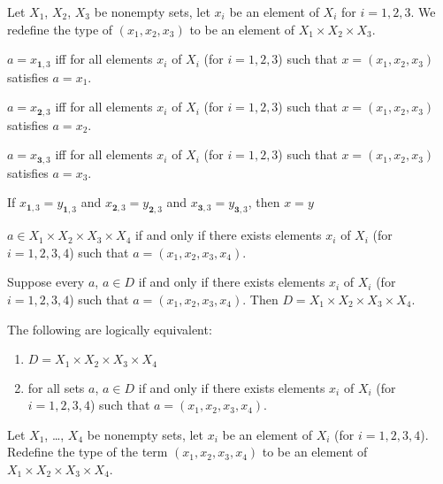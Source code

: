 \documentclass{article}
\begin{document}
\begin{definition}
Let $X_{1}$, $X_{2}$, $X_{3}$ be nonempty sets, let $x_{i}$ be an
element of $X_{i}$ for $i=1,2,3$.
We redefine the type of $(x_{1},x_{2},x_{3})$ to be an element of
$X_{1}\times X_{2}\times X_{3}$.
\end{definition}

\begin{thm}
\item\label{domain1:6} $a=x_{\mathbf{1},3}$ iff for all elements $x_{i}$ of $X_{i}$ (for $i=1,2,3$) such that $x=(x_{1},x_{2},x_{3})$ satisfies $a=x_{1}$.
\item\label{domain1:7} $a=x_{\mathbf{2},3}$ iff for all elements $x_{i}$ of $X_{i}$ (for $i=1,2,3$) such that $x=(x_{1},x_{2},x_{3})$ satisfies $a=x_{2}$.
\item\label{domain1:8} $a=x_{\mathbf{3},3}$ iff for all elements $x_{i}$ of $X_{i}$ (for $i=1,2,3$) such that $x=(x_{1},x_{2},x_{3})$ satisfies $a=x_{3}$.
\item\label{domain1:9} If $x_{\mathbf{1},3}=y_{\mathbf{1},3}$ and
  $x_{\mathbf{2},3}=y_{\mathbf{2},3}$ and
  $x_{\mathbf{3},3}=y_{\mathbf{3},3}$, then $x=y$
\item\label{domain1:10} $a\in X_{1}\times X_{2}\times X_{3}\times X_{4}$
  if and only if there exists elements $x_{i}$ of $X_{i}$ (for $i=1,2,3,4$)
  such that $a=(x_{1},x_{2},x_{3},x_{4})$.
\item\label{domain1:11} Suppose every $a$, $a\in D$ if and only if there
  exists elements $x_{i}$ of $X_{i}$ (for $i=1,2,3,4$) such that
  $a=(x_{1},x_{2},x_{3},x_{4})$.
  Then $D=X_{1}\times X_{2}\times X_{3}\times X_{4}$.
\item\label{domain1:12} The following are logically equivalent:
  \begin{enumerate}[label=(\roman*)]
  \item $D=X_{1}\times X_{2}\times X_{3}\times X_{4}$
  \item for all sets $a$, $a\in D$ if and only if there exists elements
    $x_{i}$ of $X_{i}$ (for $i=1,2,3,4$) such that $a=(x_{1},x_{2},x_{3},x_{4})$.
  \end{enumerate}
\end{thm}

\begin{definition}
Let $X_{1}$, \dots, $X_{4}$ be nonempty sets, let $x_{i}$ be an element
of $X_{i}$ (for $i=1,2,3,4$). Redefine the type of the term
$(x_{1},x_{2},x_{3},x_{4})$ to be an element of $X_{1}\times X_{2}\times X_{3}\times X_{4}$.
\end{definition}
\end{document}
